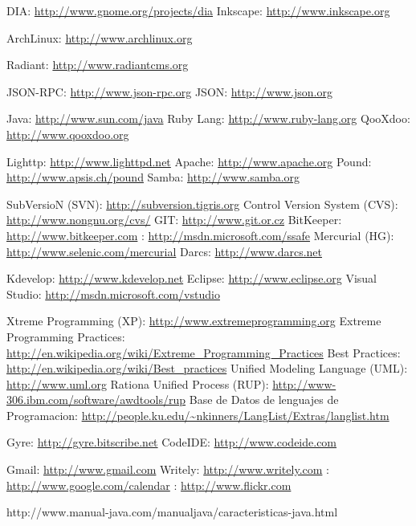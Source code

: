 \begin{thebibliography}{99}

 DIA: \url{http://www.gnome.org/projects/dia}
 Inkscape: \url{http://www.inkscape.org}

 ArchLinux: \url{http://www.archlinux.org}

 Radiant: \url{http://www.radiantcms.org}

 JSON-RPC: \url{http://www.json-rpc.org}
 JSON: \url{http://www.json.org}

 Java: \url{http://www.sun.com/java}
 Ruby Lang: \url{http://www.ruby-lang.org}
 QooXdoo: \url{http://www.qooxdoo.org}

 Lighttp: \url{http://www.lighttpd.net}
 Apache: \url{http://www.apache.org}
 Pound: \url{http://www.apsis.ch/pound}
 Samba: \url{http://www.samba.org}

 SubVersioN (SVN): \url{http://subversion.tigris.org}
 Control Version System (CVS): \url{http://www.nongnu.org/cvs/}
 GIT: \url{http://www.git.or.cz}
 BitKeeper: \url{http://www.bitkeeper.com}
 : \url{http://msdn.microsoft.com/ssafe}
 Mercurial (HG): \url{http://www.selenic.com/mercurial}
 Darcs: \url{http://www.darcs.net}

 Kdevelop: \url{http://www.kdevelop.net}
 Eclipse: \url{http://www.eclipse.org}
 Visual Studio: \url{http://msdn.microsoft.com/vstudio}

 Xtreme Programming (XP): \url{http://www.extremeprogramming.org}
 Extreme Programming Practices:
	\url{http://en.wikipedia.org/wiki/Extreme_Programming_Practices}
 Best Practices: \url{http://en.wikipedia.org/wiki/Best_practices}
 Unified Modeling Language (UML): \url{http://www.uml.org}
 Rationa Unified Process (RUP): \url{http://www-306.ibm.com/software/awdtools/rup}
 Base de Datos de lenguajes de Programacion:
	\url{http://people.ku.edu/~nkinners/LangList/Extras/langlist.htm}

 Gyre: \url{http://gyre.bitscribe.net}
 CodeIDE: \url{http://www.codeide.com}

 Gmail: \url{http://www.gmail.com}
 Writely: \url{http://www.writely.com}
 : \url{http://www.google.com/calendar}
 : \url{http://www.flickr.com}

http://www.manual-java.com/manualjava/caracteristicas-java.html

\end{thebibliography}
